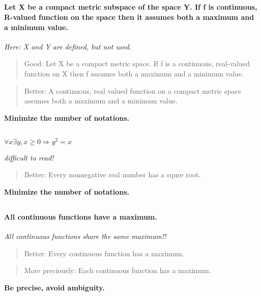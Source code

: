 \documentclass[]{report}
\begin{document}
\subsection{}
\paragraph{Let X be a compact metric subspace of the space Y. If f is
continuous, R-valued function on the space then it assumes
both a maximum and a minimum value.}
\begin{center}
\emph{{\large Here: X and Y are defined, but not used.}}
\end{center}
\begin{verse}
{\large Good:} Let X be a compact metric space. If f is a continuous,
real-valued function on X then f assumes both a maximum and
a minimum value. 
\end{verse}

\begin{verse}
{\large Better:} A continuous, real valued function on a compact metric
space assumes both a maximum and a minimum value.
\end{verse}
\begin{center}
\textbf{{\large Minimize the number of notations.}}
\end{center}

\subsection{}
$\forall x \exists y,x \geq 0 \Rightarrow y^2=x$
\begin{center}
\emph{{\large difficult to read!}}
\end{center}
\begin{verse}
{\large Better:} Every nonnegative real number has a squre root.
\end{verse}
\begin{center}
\textbf{{\large Minimize the number of notations.}}
\end{center}

\subsection{}
\paragraph{All continuous functions have a maximum.}
\begin{center}
\emph{{\large All continuous functions share the same maximum!!}}
\end{center}
\begin{verse}
{\large Better:} Every continuous function has a maximum.
\end{verse}
\begin{verse}
{\large More preciously:} Each continuous function has a maximum.
\end{verse}
\begin{center}
\textbf{{\large Be precise, avoid ambiguity.}}
\end{center}
\end{document}
